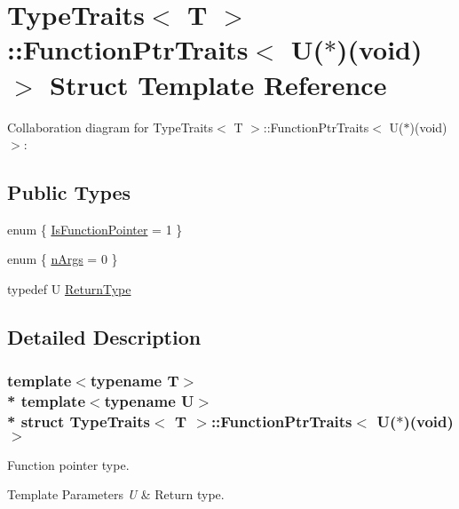\hypertarget{structTypeTraits_1_1FunctionPtrTraits_3_01U_07_5_08_07void_08_4}{}\section{Type\+Traits$<$ T $>$\+:\+:Function\+Ptr\+Traits$<$ U($\ast$)(void)$>$ Struct Template Reference}
\label{structTypeTraits_1_1FunctionPtrTraits_3_01U_07_5_08_07void_08_4}


Collaboration diagram for Type\+Traits$<$ T $>$\+:\+:Function\+Ptr\+Traits$<$ U($\ast$)(void)$>$\+:
\subsection*{Public Types}
\begin{DoxyCompactItemize}
\item 
enum \{ \hyperlink{structTypeTraits_1_1FunctionPtrTraits_3_01U_07_5_08_07void_08_4_a76d1f20c010aa03d3aaf029f7714b619ad0beb864e50ea35770e107c61f1ca453}{Is\+Function\+Pointer} = 1
 \}
\item 
enum \{ \hyperlink{structTypeTraits_1_1FunctionPtrTraits_3_01U_07_5_08_07void_08_4_a97d3e792758c691c34323daf59b721e8ac3ac1bb6a7fd17677664a89b08224b12}{n\+Args} = 0
 \}
\item 
typedef U \hyperlink{structTypeTraits_1_1FunctionPtrTraits_3_01U_07_5_08_07void_08_4_afa8114a12b207631358cef7f97c33307}{Return\+Type}
\end{DoxyCompactItemize}


\subsection{Detailed Description}
\subsubsection*{template$<$typename T$>$\\*
template$<$typename U$>$\\*
struct Type\+Traits$<$ T $>$\+::\+Function\+Ptr\+Traits$<$ U($\ast$)(void)$>$}

Function pointer type. 
\begin{DoxyTemplParams}{Template Parameters}
{\em U} & Return type. \\
\hline
\end{DoxyTemplParams}


